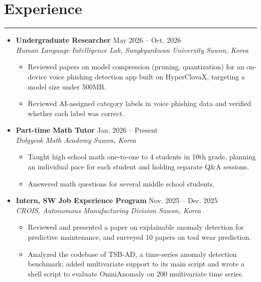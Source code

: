 \documentclass[letterpaper, 10pt]{article}
\begin{document}
\section*{Experience}
\hrule
\vspace{4pt}
\begin{itemize}
    \item[]
        \textbf{Undergraduate Researcher} \hfill May 2026 -- Oct. 2026 \\
        \textit{Human Language Intelligence Lab, Sungkyunkwan University} \hfill \textit{Suwon, Korea}
        \begin{itemize}
            \item Reviewed papers on model compression (pruning, quantization) for an on-device voice phishing detection app built on HyperClovaX, targeting a model size under 500MB.
            \item Reviewed AI-assigned category labels in voice phishing data and verified whether each label was correct.
        \end{itemize}
    \item[]
        \textbf{Part-time Math Tutor} \hfill Jan. 2026 -- Present \\
        \textit{Dolgyeok Math Academy} \hfill \textit{Suwon, Korea}
        \begin{itemize}
            \item Taught high school math one-to-one to 4 students in 10th grade, planning an individual pace for each student and holding separate Q\&A sessions.
            \item Answered math questions for several middle school students.
        \end{itemize}
    \item[]
        \textbf{Intern, SW Job Experience Program} \hfill Nov. 2025 -- Dec. 2025 \\
        \textit{CROIS, Autonomous Manufacturing Division} \hfill \textit{Suwon, Korea}
        \begin{itemize}
            \item Reviewed and presented a paper on explainable anomaly detection for predictive maintenance, and surveyed 10 papers on tool wear prediction.
            \item Analyzed the codebase of TSB-AD, a time-series anomaly detection benchmark; added multivariate support to its main script and wrote a shell script to evaluate OmniAnomaly on 200 multivariate time series.
        \end{itemize}
\end{itemize}
\end{document}
